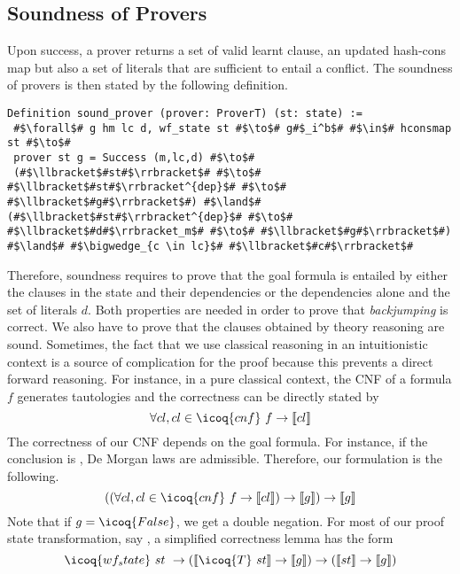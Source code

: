 \documentclass[utf8,a4paper,UKenglish,cleveref, autoref, thm-restate]{lipics-v2021}
\begin{document}
\subsection{Soundness of Provers}
Upon success, a prover  returns a set of valid learnt
clause, an updated hash-cons map but also a set of literals that are
sufficient to entail a conflict.  The soundness of provers is then
stated by the following definition.
\begin{verbatim}
Definition sound_prover (prover: ProverT) (st: state) :=
 #$\forall$# g hm lc d, wf_state st #$\to$# g#$_i^b$# #$\in$# hconsmap st #$\to$#
 prover st g = Success (m,lc,d) #$\to$#
 (#$\llbracket$#st#$\rrbracket$# #$\to$# #$\llbracket$#st#$\rrbracket^{dep}$# #$\to$# #$\llbracket$#g#$\rrbracket$#) #$\land$# (#$\llbracket$#st#$\rrbracket^{dep}$# #$\to$# #$\llbracket$#d#$\rrbracket_m$# #$\to$# #$\llbracket$#g#$\rrbracket$#)  #$\land$# #$\bigwedge_{c \in lc}$# #$\llbracket$#c#$\rrbracket$#
\end{verbatim}
Therefore, soundness requires to prove that the goal formula 
is entailed by either the clauses in the state and their dependencies
or the dependencies alone and the set of literals $d$.
%
Both properties are needed in order to prove that \emph{backjumping} is correct.
We also have to prove that the clauses  obtained by theory reasoning are
sound. 
%
Sometimes, the fact that we use classical reasoning in an
intuitionistic context is a source of complication for the proof
because this prevents a direct forward reasoning. 
%
For instance, in a pure classical context, the CNF
of a formula $f$ generates tautologies and the correctness can be
directly stated by
\[
  \forall cl, cl \in \icoq{cnf}\ f \to \llbracket cl \rrbracket
\]
The correctness of our CNF depends on the goal formula. For instance,
if the conclusion is , De Morgan laws are admissible.
Therefore, our formulation is the following.
\[
  ((\forall cl, cl \in \icoq{cnf}\ f \to \llbracket cl \rrbracket) \to \llbracket g\rrbracket) \to \llbracket g\rrbracket
\]
Note that if $g=\icoq{False}$, we get a double negation.
For most of our proof state transformation, say , a simplified  correctness lemma has the form
\[
  \icoq{wf_state}\ st\ \to
  (\llbracket \icoq{T}\ st \rrbracket \to \llbracket g \rrbracket) \to 
  (\llbracket st \rrbracket \to \llbracket g \rrbracket)
\]
\end{document}
